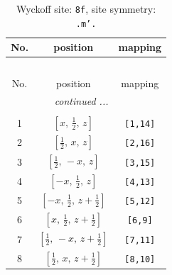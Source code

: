 \documentclass[fleqn,8pt]{jsarticle}
\begin{document}
\begin{longtable}{ccc}
\caption{Wyckoff site: {\tt 8f}, site symmetry: {\tt .m'.}}
 \\
 \hline \hline
No. & position & mapping \\ \hline \endfirsthead

\multicolumn{2}{l}{\tablename\ \thetable{}} \\
 \hline \hline
No. & position & mapping \\ \hline \endhead

 \hline \hline
\multicolumn{2}{r}{\footnotesize\it continued ...} \\ \endfoot

 \hline \hline
\multicolumn{2}{r}{} \\ \endlastfoot

1 & $\left[ x,\, \frac{1}{2},\, z \right]$ & {\tt [1,14]} \\ \hline
2 & $\left[ \frac{1}{2},\, x,\, z \right]$ & {\tt [2,16]} \\ \hline
3 & $\left[ \frac{1}{2},\, - x,\, z \right]$ & {\tt [3,15]} \\ \hline
4 & $\left[ - x,\, \frac{1}{2},\, z \right]$ & {\tt [4,13]} \\ \hline
5 & $\left[ - x,\, \frac{1}{2},\, z + \frac{1}{2} \right]$ & {\tt [5,12]} \\ \hline
6 & $\left[ x,\, \frac{1}{2},\, z + \frac{1}{2} \right]$ & {\tt [6,9]} \\ \hline
7 & $\left[ \frac{1}{2},\, - x,\, z + \frac{1}{2} \right]$ & {\tt [7,11]} \\ \hline
8 & $\left[ \frac{1}{2},\, x,\, z + \frac{1}{2} \right]$ & {\tt [8,10]} \\
\end{longtable}
\renewcommand{\arraystretch}{1.2}
\end{document}
